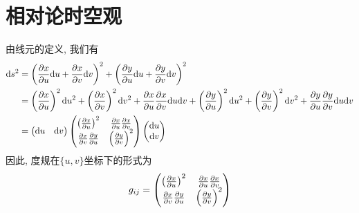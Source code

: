 \chapter{相对论时空观}
\begin{solution}
    由线元的定义, 我们有
    \[
        \begin{aligned}
            \dd s^2 &= \left(\frac{\partial x}{\partial u} \dd u + \frac{\partial x}{\partial v} \dd v\right)^2 + \left(\frac{\partial y}{\partial u} \dd u + \frac{\partial y}{\partial v} \dd v\right)^2 \\
            &= \left(\frac{\partial x}{\partial u}\right)^2 \dd u^2 + \left(\frac{\partial x}{\partial v}\right)^2 \dd v^2 + \frac{\partial x}{\partial u} \frac{\partial x}{\partial v} \dd u \dd v + \left(\frac{\partial y}{\partial u}\right)^2 \dd u^2 + \left(\frac{\partial y}{\partial v}\right)^2 \dd v^2 + \frac{\partial y}{\partial u} \frac{\partial y}{\partial v} \dd u \dd v \\
            &= \begin{pmatrix}
                \dd u & \dd v
            \end{pmatrix} \begin{pmatrix}
                \left(\frac{\partial x}{\partial u}\right)^2 & \frac{\partial x}{\partial u} \frac{\partial x}{\partial v} \\
                \frac{\partial x}{\partial v} \frac{\partial y}{\partial u} & \left(\frac{\partial y}{\partial v}\right)^2
            \end{pmatrix} \begin{pmatrix}
                \dd u \\ \dd v
            \end{pmatrix}
        \end{aligned}
    \]
    因此, 度规在$\{u,v\}$坐标下的形式为
    \[
        g_{ij} = \begin{pmatrix}
            \left(\frac{\partial x}{\partial u}\right)^2 & \frac{\partial x}{\partial u} \frac{\partial x}{\partial v} \\
            \frac{\partial x}{\partial v} \frac{\partial y}{\partial u} & \left(\frac{\partial y}{\partial v}\right)^2
        \end{pmatrix}
    \]
\end{solution}

